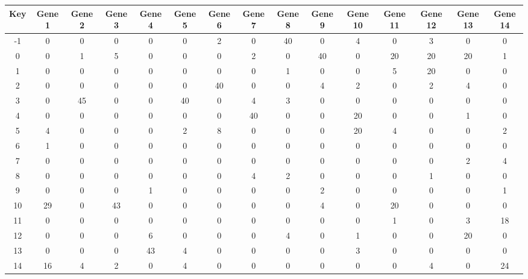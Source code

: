 \begin{tabular}{|c|c|c|c|c|c|c|c|c|c|c|c|c|c|c|}
\hline
Key & Gene 1 & Gene 2 & Gene 3 & Gene 4 & Gene 5 & Gene 6 & Gene 7 & Gene 8 & Gene 9 & Gene 10 & Gene 11 & Gene 12 & Gene 13 & Gene 14 \\
\hline
-1 & 0 & 0 & 0 & 0 & 0 & 2 & 0 & 40 & 0 & 4 & 0 & 3 & 0 & 0 \\
0 & 0 & 1 & 5 & 0 & 0 & 0 & 2 & 0 & 40 & 0 & 20 & 20 & 20 & 1 \\
1 & 0 & 0 & 0 & 0 & 0 & 0 & 0 & 1 & 0 & 0 & 5 & 20 & 0 & 0 \\
2 & 0 & 0 & 0 & 0 & 0 & 40 & 0 & 0 & 4 & 2 & 0 & 2 & 4 & 0 \\
3 & 0 & 45 & 0 & 0 & 40 & 0 & 4 & 3 & 0 & 0 & 0 & 0 & 0 & 0 \\
4 & 0 & 0 & 0 & 0 & 0 & 0 & 40 & 0 & 0 & 20 & 0 & 0 & 1 & 0 \\
5 & 4 & 0 & 0 & 0 & 2 & 8 & 0 & 0 & 0 & 20 & 4 & 0 & 0 & 2 \\
6 & 1 & 0 & 0 & 0 & 0 & 0 & 0 & 0 & 0 & 0 & 0 & 0 & 0 & 0 \\
7 & 0 & 0 & 0 & 0 & 0 & 0 & 0 & 0 & 0 & 0 & 0 & 0 & 2 & 4 \\
8 & 0 & 0 & 0 & 0 & 0 & 0 & 4 & 2 & 0 & 0 & 0 & 1 & 0 & 0 \\
9 & 0 & 0 & 0 & 1 & 0 & 0 & 0 & 0 & 2 & 0 & 0 & 0 & 0 & 1 \\
10 & 29 & 0 & 43 & 0 & 0 & 0 & 0 & 0 & 4 & 0 & 20 & 0 & 0 & 0 \\
11 & 0 & 0 & 0 & 0 & 0 & 0 & 0 & 0 & 0 & 0 & 1 & 0 & 3 & 18 \\
12 & 0 & 0 & 0 & 6 & 0 & 0 & 0 & 4 & 0 & 1 & 0 & 0 & 20 & 0 \\
13 & 0 & 0 & 0 & 43 & 4 & 0 & 0 & 0 & 0 & 3 & 0 & 0 & 0 & 0 \\
14 & 16 & 4 & 2 & 0 & 4 & 0 & 0 & 0 & 0 & 0 & 0 & 4 & 0 & 24 \\
\hline
\end{tabular}